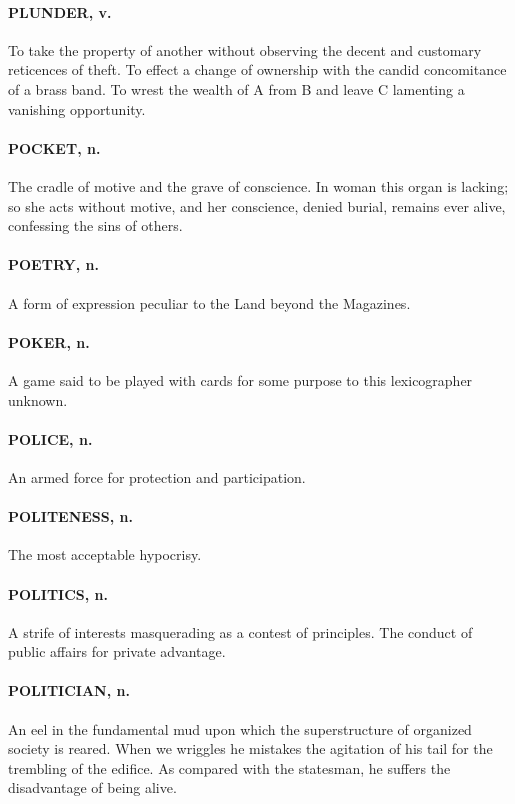 \documentclass[11pt]{article}
\begin{document}
\paragraph{PLUNDER, v.}  To take the property of another without observing the
decent and customary reticences of theft.  To effect a change of
ownership with the candid concomitance of a brass band.  To wrest the
wealth of A from B and leave C lamenting a vanishing opportunity.

\paragraph{POCKET, n.}  The cradle of motive and the grave of conscience.  In
woman this organ is lacking; so she acts without motive, and her
conscience, denied burial, remains ever alive, confessing the sins of
others.

\paragraph{POETRY, n.}  A form of expression peculiar to the Land beyond the
Magazines.

\paragraph{POKER, n.}  A game said to be played with cards for some purpose to
this lexicographer unknown.

\paragraph{POLICE, n.}  An armed force for protection and participation.

\paragraph{POLITENESS, n.}  The most acceptable hypocrisy.

\paragraph{POLITICS, n.}  A strife of interests masquerading as a contest of
principles.  The conduct of public affairs for private advantage.

\paragraph{POLITICIAN, n.}  An eel in the fundamental mud upon which the
superstructure of organized society is reared.  When we wriggles he
mistakes the agitation of his tail for the trembling of the edifice.
As compared with the statesman, he suffers the disadvantage of being
alive.
\end{document}
